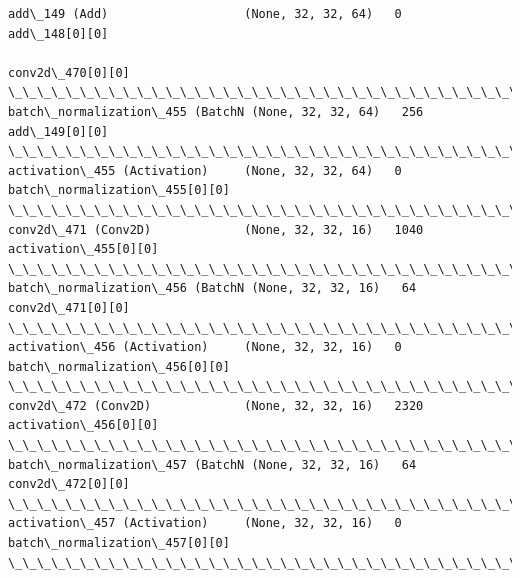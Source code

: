 \documentclass[11pt]{article}
\begin{document}
\begin{Verbatim}[commandchars=\\\{\}]
add\_149 (Add)                   (None, 32, 32, 64)   0           add\_148[0][0]                    
                                                                 conv2d\_470[0][0]                 
\_\_\_\_\_\_\_\_\_\_\_\_\_\_\_\_\_\_\_\_\_\_\_\_\_\_\_\_\_\_\_\_\_\_\_\_\_\_\_\_\_\_\_\_\_\_\_\_\_\_\_\_\_\_\_\_\_\_\_\_\_\_\_\_\_\_\_\_\_\_\_\_\_\_\_\_\_\_\_\_\_\_\_\_\_\_\_\_\_\_\_\_\_\_\_\_\_\_
batch\_normalization\_455 (BatchN (None, 32, 32, 64)   256         add\_149[0][0]                    
\_\_\_\_\_\_\_\_\_\_\_\_\_\_\_\_\_\_\_\_\_\_\_\_\_\_\_\_\_\_\_\_\_\_\_\_\_\_\_\_\_\_\_\_\_\_\_\_\_\_\_\_\_\_\_\_\_\_\_\_\_\_\_\_\_\_\_\_\_\_\_\_\_\_\_\_\_\_\_\_\_\_\_\_\_\_\_\_\_\_\_\_\_\_\_\_\_\_
activation\_455 (Activation)     (None, 32, 32, 64)   0           batch\_normalization\_455[0][0]    
\_\_\_\_\_\_\_\_\_\_\_\_\_\_\_\_\_\_\_\_\_\_\_\_\_\_\_\_\_\_\_\_\_\_\_\_\_\_\_\_\_\_\_\_\_\_\_\_\_\_\_\_\_\_\_\_\_\_\_\_\_\_\_\_\_\_\_\_\_\_\_\_\_\_\_\_\_\_\_\_\_\_\_\_\_\_\_\_\_\_\_\_\_\_\_\_\_\_
conv2d\_471 (Conv2D)             (None, 32, 32, 16)   1040        activation\_455[0][0]             
\_\_\_\_\_\_\_\_\_\_\_\_\_\_\_\_\_\_\_\_\_\_\_\_\_\_\_\_\_\_\_\_\_\_\_\_\_\_\_\_\_\_\_\_\_\_\_\_\_\_\_\_\_\_\_\_\_\_\_\_\_\_\_\_\_\_\_\_\_\_\_\_\_\_\_\_\_\_\_\_\_\_\_\_\_\_\_\_\_\_\_\_\_\_\_\_\_\_
batch\_normalization\_456 (BatchN (None, 32, 32, 16)   64          conv2d\_471[0][0]                 
\_\_\_\_\_\_\_\_\_\_\_\_\_\_\_\_\_\_\_\_\_\_\_\_\_\_\_\_\_\_\_\_\_\_\_\_\_\_\_\_\_\_\_\_\_\_\_\_\_\_\_\_\_\_\_\_\_\_\_\_\_\_\_\_\_\_\_\_\_\_\_\_\_\_\_\_\_\_\_\_\_\_\_\_\_\_\_\_\_\_\_\_\_\_\_\_\_\_
activation\_456 (Activation)     (None, 32, 32, 16)   0           batch\_normalization\_456[0][0]    
\_\_\_\_\_\_\_\_\_\_\_\_\_\_\_\_\_\_\_\_\_\_\_\_\_\_\_\_\_\_\_\_\_\_\_\_\_\_\_\_\_\_\_\_\_\_\_\_\_\_\_\_\_\_\_\_\_\_\_\_\_\_\_\_\_\_\_\_\_\_\_\_\_\_\_\_\_\_\_\_\_\_\_\_\_\_\_\_\_\_\_\_\_\_\_\_\_\_
conv2d\_472 (Conv2D)             (None, 32, 32, 16)   2320        activation\_456[0][0]             
\_\_\_\_\_\_\_\_\_\_\_\_\_\_\_\_\_\_\_\_\_\_\_\_\_\_\_\_\_\_\_\_\_\_\_\_\_\_\_\_\_\_\_\_\_\_\_\_\_\_\_\_\_\_\_\_\_\_\_\_\_\_\_\_\_\_\_\_\_\_\_\_\_\_\_\_\_\_\_\_\_\_\_\_\_\_\_\_\_\_\_\_\_\_\_\_\_\_
batch\_normalization\_457 (BatchN (None, 32, 32, 16)   64          conv2d\_472[0][0]                 
\_\_\_\_\_\_\_\_\_\_\_\_\_\_\_\_\_\_\_\_\_\_\_\_\_\_\_\_\_\_\_\_\_\_\_\_\_\_\_\_\_\_\_\_\_\_\_\_\_\_\_\_\_\_\_\_\_\_\_\_\_\_\_\_\_\_\_\_\_\_\_\_\_\_\_\_\_\_\_\_\_\_\_\_\_\_\_\_\_\_\_\_\_\_\_\_\_\_
activation\_457 (Activation)     (None, 32, 32, 16)   0           batch\_normalization\_457[0][0]    
\_\_\_\_\_\_\_\_\_\_\_\_\_\_\_\_\_\_\_\_\_\_\_\_\_\_\_\_\_\_\_\_\_\_\_\_\_\_\_\_\_\_\_\_\_\_\_\_\_\_\_\_\_\_\_\_\_\_\_\_\_\_\_\_\_\_\_\_\_\_\_\_\_\_\_\_\_\_\_\_\_\_\_\_\_\_\_\_\_\_\_\_\_\_\_\_\_\_

\end{Verbatim}
\end{document}
